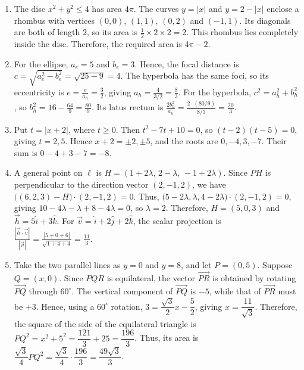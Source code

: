 \documentclass[11pt,a4paper]{article}
\begin{document}
\begin{enumerate}
\item The disc $x^2+y^2\le 4$ has area $4\pi$. The curves $y=|x|$ and $y=2-|x|$ enclose a rhombus with vertices $(0,0)$, $(1,1)$, $(0,2)$ and $(-1,1)$. Its diagonals are both of length $2$, so its area is $\frac12\times2\times2=2$. This rhombus lies completely inside the disc. Therefore, the required area is $4\pi-2$.
\item For the ellipse, $a_e=5$ and $b_e=3$. Hence, the focal distance is $c=\sqrt{a_e^2-b_e^2}=\sqrt{25-9}=4$. The hyperbola has the same foci, so its eccentricity is $e=\frac{c}{a_h}=\frac{3}{2}$, giving $a_h=\frac{4}{3/2}=\frac{8}{3}$. For the hyperbola, $c^2=a_h^2+b_h^2$, so $b_h^2=16-\frac{64}{9}=\frac{80}{9}$. Its latus rectum is $\frac{2b_h^2}{a_h}=\frac{2\cdot(80/9)}{8/3}=\frac{20}{3}$.
\item Put \(t=|x+2|\), where \(t\ge 0\). Then \(t^2-7t+10=0\), so \((t-2)(t-5)=0\), giving \(t=2,5\). Hence \(x+2=\pm2,\pm5\), and the roots are \(0,-4,3,-7\). Their sum is \(0-4+3-7=-8\).
\item A general point on $\ell$ is $H=(1+2\lambda,\,2-\lambda,\,-1+2\lambda)$. Since $PH$ is perpendicular to the direction vector $(2,-1,2)$, we have $\big((6,2,3)-H\big)\cdot(2,-1,2)=0$. Thus, $\big(5-2\lambda,\lambda,4-2\lambda\big)\cdot(2,-1,2)=0$, giving $10-4\lambda-\lambda+8-4\lambda=0$, so $\lambda=2$. Therefore, $H=(5,0,3)$ and $\vec h=5\hat i+3\hat k$. For $\vec v=\hat i+2\hat j+2\hat k$, the scalar projection is $\frac{|\vec h\cdot\vec v|}{|\vec v|}=\frac{|5+0+6|}{\sqrt{1+4+4}}=\frac{11}{3}$.
\item Take the two parallel lines as $y=0$ and $y=8$, and let $P=(0,5)$. Suppose $Q=(x,0)$. Since $PQR$ is equilateral, the vector $\overrightarrow{PR}$ is obtained by rotating $\overrightarrow{PQ}$ through $60^\circ$. The vertical component of $\overrightarrow{PQ}$ is $-5$, while that of $\overrightarrow{PR}$ must be $+3$. Hence, using a $60^\circ$ rotation, $3=\dfrac{\sqrt{3}}{2}x-\dfrac{5}{2}$, giving $x=\dfrac{11}{\sqrt{3}}$. Therefore, the square of the side of the equilateral triangle is $PQ^2=x^2+5^2=\dfrac{121}{3}+25=\dfrac{196}{3}$. Thus, its area is $\dfrac{\sqrt{3}}{4}PQ^2=\dfrac{\sqrt{3}}{4}\cdot\dfrac{196}{3}=\boxed{\dfrac{49\sqrt{3}}{3}}$.
\end{enumerate}
\end{document}
